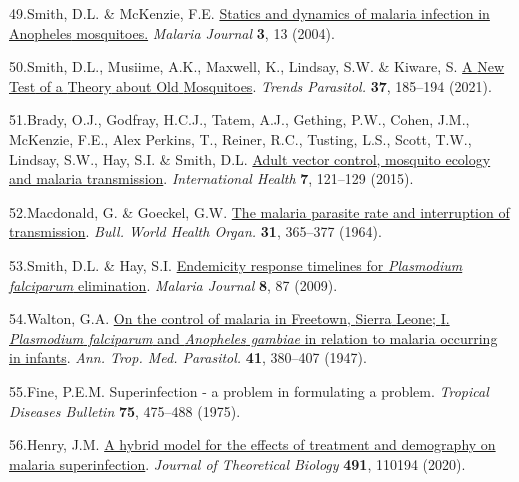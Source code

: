 \documentclass[
]{book}
\newlength{\cslhangindent}
\newlength{\cslentryspacingunit} %
\newenvironment{CSLReferences}[2] %
 {%
  \setlength{\parindent}{0pt}
  \ifodd #1
  \let\oldpar\par
  \def\par{\hangindent=\cslhangindent\oldpar}
  \fi
  \setlength{\parskip}{#2\cslentryspacingunit}
 }%
 {}
\begin{document}
\begin{CSLReferences}{0}{0}
\leavevmode{}%
49.Smith, D.L. \& McKenzie, F.E. \href{https://doi.org/10.1186/1475-2875-3-13}{Statics and dynamics of malaria infection in {Anopheles} mosquitoes.} \emph{Malaria Journal} \textbf{3}, 13 (2004).

\leavevmode{}%
50.Smith, D.L., Musiime, A.K., Maxwell, K., Lindsay, S.W. \& Kiware, S. \href{https://doi.org/10.1016/j.pt.2020.10.011}{A {New} {Test} of a {Theory} about {Old} {Mosquitoes}}. \emph{Trends Parasitol.} \textbf{37}, 185--194 (2021).

\leavevmode{}%
51.Brady, O.J., Godfray, H.C.J., Tatem, A.J., Gething, P.W., Cohen, J.M., McKenzie, F.E., Alex Perkins, T., Reiner, R.C., Tusting, L.S., Scott, T.W., Lindsay, S.W., Hay, S.I. \& Smith, D.L. \href{https://doi.org/10.1093/inthealth/ihv010}{Adult vector control, mosquito ecology and malaria transmission}. \emph{International Health} \textbf{7}, 121--129 (2015).

\leavevmode{}%
52.Macdonald, G. \& Goeckel, G.W. \href{https://www.ncbi.nlm.nih.gov/pubmed/14267746}{The malaria parasite rate and interruption of transmission}. \emph{Bull. World Health Organ.} \textbf{31}, 365--377 (1964).

\leavevmode{}%
53.Smith, D.L. \& Hay, S.I. \href{https://doi.org/10.1186/1475-2875-8-87}{Endemicity response timelines for \emph{{Plasmodium} falciparum} elimination}. \emph{Malaria Journal} \textbf{8}, 87 (2009).

\leavevmode{}%
54.Walton, G.A. \href{https://doi.org/10.1080/00034983.1947.11685341}{On the control of malaria in {Freetown}, {Sierra} {Leone}; {I}. \emph{{Plasmodium} falciparum} and \emph{{Anopheles} gambiae} in relation to malaria occurring in infants}. \emph{Ann. Trop. Med. Parasitol.} \textbf{41}, 380--407 (1947).

\leavevmode{}%
55.Fine, P.E.M. Superinfection - a problem in formulating a problem. \emph{Tropical Diseases Bulletin} \textbf{75}, 475--488 (1975).

\leavevmode{}%
56.Henry, J.M. \href{https://doi.org/10.1016/j.jtbi.2020.110194}{A hybrid model for the effects of treatment and demography on malaria superinfection}. \emph{Journal of Theoretical Biology} \textbf{491}, 110194 (2020).


\end{CSLReferences}
\end{document}
